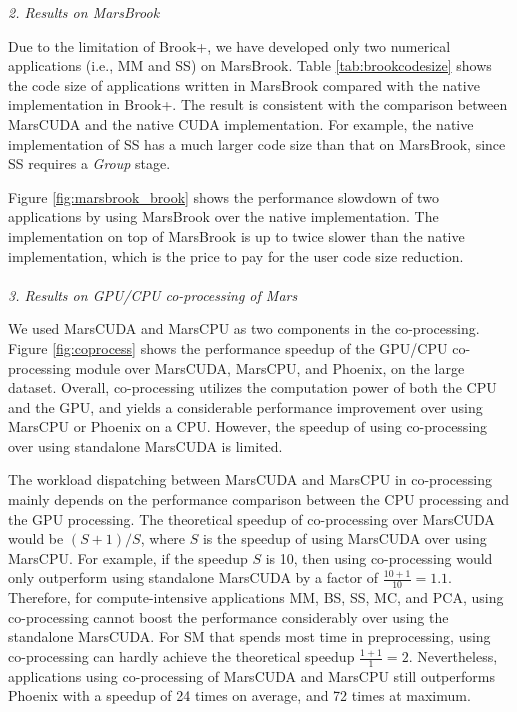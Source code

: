 {\em 2. Results on MarsBrook}

Due to the limitation of Brook+, we have developed only two
numerical applications (i.e., MM and SS) on MarsBrook. Table
\ref{tab:brookcodesize} shows the code size of applications written
in MarsBrook compared with the native implementation in Brook+. The
result is consistent with the comparison between MarsCUDA and the
native CUDA implementation. For example, the native implementation
of SS has a much larger code size than that on MarsBrook,
since SS requires a {\em Group} stage.

\doublerulesep 0.1pt
\begin{table}[htb]
  \centering
\end{table}

Figure \ref{fig:marsbrook_brook} shows the performance slowdown of
two applications by using MarsBrook over the native implementation.
The implementation on top of MarsBrook is up to twice slower than
the native implementation, which is the price to pay for the user code size reduction.
\\\\
{\em 3. Results on GPU/CPU co-processing of Mars}

We used MarsCUDA and MarsCPU as two components in the co-processing.
Figure \ref{fig:coprocess} shows the performance speedup of the GPU/CPU co-processing module over MarsCUDA, MarsCPU, and Phoenix, on the large dataset.
Overall, co-processing utilizes the computation power of both the CPU and the GPU, and yields a considerable performance improvement over using MarsCPU or Phoenix on a CPU.
However, the speedup of using co-processing over using standalone MarsCUDA is limited.

The workload dispatching between MarsCUDA and MarsCPU in co-processing mainly depends on the performance comparison between the CPU processing and the GPU processing.
The theoretical speedup of co-processing over MarsCUDA would be $(S + 1) / S$, where $S$ is the speedup of using MarsCUDA over using MarsCPU.
For example, if the speedup $S$ is 10, then using co-processing would only outperform using standalone MarsCUDA by a factor of $\frac{10+1}{10} = 1.1$.
Therefore, for compute-intensive applications MM, BS, SS, MC, and PCA, using co-processing cannot boost the performance considerably over using the standalone MarsCUDA.
For SM that spends most time in preprocessing, using co-processing can hardly achieve the theoretical speedup $\frac{1+1}{1} = 2$.
Nevertheless, applications using co-processing of MarsCUDA and MarsCPU still outperforms Phoenix with a speedup of 24 times on average, and 72 times at maximum.

